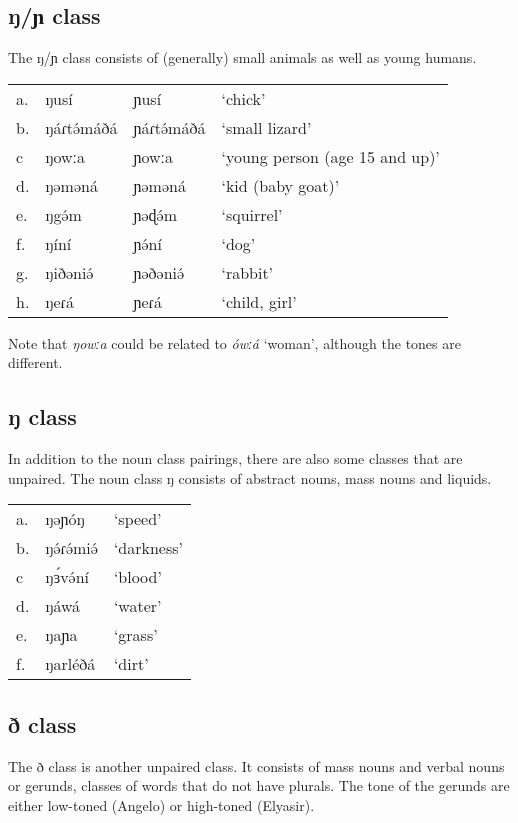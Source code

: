 \subsection{ŋ/ɲ class}
The ŋ/ɲ class consists of (generally) small animals as well as young humans. 

\ea	
\begin{tabular}[t]{llll}
a.	&	ŋusí		&	ɲusí	&	‘chick’\\
b.	&	ŋáɾtə́máðá	&	ɲáɾtə́máðá&	‘small lizard’\\
c	&	ŋowːa		&	ɲowːa	&	‘young person (age 15 and up)’\\
d.	&	ŋəməná		&	ɲəməná	&	‘kid (baby goat)’\\
e.	&	ŋgə́m			&	ɲəɖə́m	&	‘squirrel’\\
f.	&	ŋíní		&	ɲə́ní		&	‘dog’\\
g.	&	ŋiðəniə́		&	ɲəðəniə́	&	‘rabbit’\\
h.	&	ŋeɾá		&	ɲeɾá	&	‘child, girl’	\\
\end{tabular}
\z

Note that \textit{ŋowːa} could be related to \textit{ówːá} ‘woman’, although the tones are different. %


\subsection{ŋ class}
In addition to the noun class pairings, there are also some classes that are unpaired. The noun class ŋ consists of abstract nouns, mass nouns and liquids. 

\ea	
\begin{tabular}[t]{lll}
a.	&	ŋəɲóŋ		&	‘speed’\\
b.	&	ŋə́ɾə́miə́		&	‘darkness’\\
c	&	ŋɜ́və́ní	 	&	‘blood’\\
d.	&	ŋáwá		&	‘water’\\
e.	&	ŋaɲa	 	&	‘grass’\\
f.	&	ŋarléðá		&	‘dirt’\\	
\end{tabular}

\z

\subsection{ð class}

The ð class is another unpaired class. It consists of mass nouns and verbal nouns or gerunds, classes of words that do not have plurals. The tone of the gerunds are either low-toned (Angelo) or high-toned (Elyasir). 

